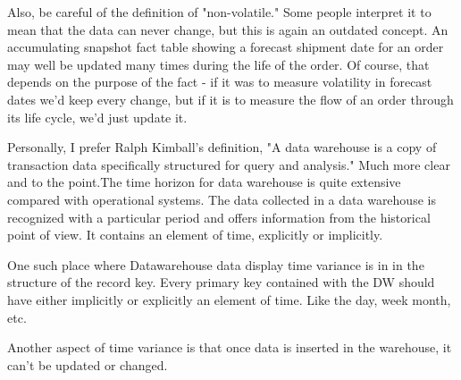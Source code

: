 \documentclass{article}
\begin{document}
Also, be careful of the definition of "non-volatile." Some people interpret it to mean that the data can never change, but this is again an outdated concept. An accumulating snapshot fact table showing a forecast shipment date for an order may well be updated many times during the life of the order. Of course, that depends on the purpose of the fact - if it was to measure volatility in forecast dates we'd keep every change, but if it is to measure the flow of an order through its life cycle, we'd just update it.

Personally, I prefer Ralph Kimball's definition, "A data warehouse is a copy of transaction data specifically structured for query and analysis." Much more clear and to the point.The time horizon for data warehouse is quite extensive compared with operational systems. The data collected in a data warehouse is recognized with a particular period and offers information from the historical point of view. It contains an element of time, explicitly or implicitly.

One such place where Datawarehouse data display time variance is in in the structure of the record key. Every primary key contained with the DW should have either implicitly or explicitly an element of time. Like the day, week month, etc.

Another aspect of time variance is that once data is inserted in the warehouse, it can't be updated or changed.
 
 \newpage
\end{document}
